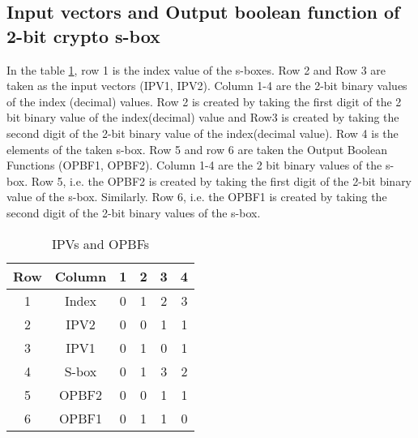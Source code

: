 \documentclass[12pt]{article}
\begin{document}
\subsection{Input vectors and Output boolean function of 2-bit crypto s-box}
In the table \ref{table:2}, row 1 is the index value of the s-boxes. Row 2 and Row 3 are taken as the input vectors (IPV1, IPV2). Column 1-4 are the 2-bit binary values of the index (decimal) values. Row 2 is created by taking the first digit of the 2 bit binary value of the index(decimal) value and Row3 is created by taking the second digit of the 2-bit binary value of the index(decimal value). Row 4 is the elements of the taken s-box. Row 5 and row 6 are taken the Output Boolean Functions (OPBF1, OPBF2). Column 1-4 are the 2 bit binary values of the s-box. Row 5, i.e. the OPBF2 is created by taking the first digit of the 2-bit binary value of the s-box. Similarly. Row 6, i.e. the OPBF1 is created by taking the second digit of the 2-bit binary values of the s-box. 
\begin{table}[H]
    \centering
    \begin{tabular}{|c|c|c|c|c|c|}
        \hline
        Row & Column & 1 & 2 & 3 & 4 \\
        \hline
        1 & Index & 0 & 1 & 2 & 3 \\
        \hline
        2 & IPV2 & 0 & 0 & 1 & 1 \\
        \hline
        3 & IPV1 & 0 & 1 & 0 & 1 \\
        \hline
        4 & S-box & 0 & 1 & 3 & 2 \\
        \hline
        5 & OPBF2 & 0 & 0 & 1 & 1 \\
        \hline
        6 & OPBF1 & 0 & 1 & 1 & 0 \\
        \hline
    \end{tabular}
    \caption{IPVs and OPBFs}
    \label{table:2}
\end{table}
\end{document}
